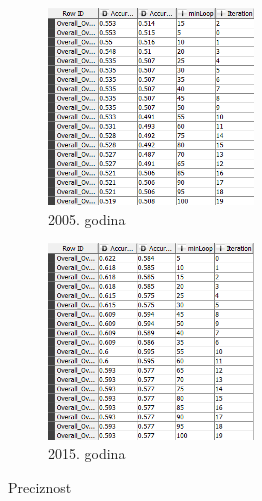 \documentclass[a4paper]{article}
\begin{document}
\begin{figure}[H]
	\begin{subfigure}[h]{\textwidth}
		\begin{center}
			\includegraphics[width=0.6\textwidth]{Klasifikacija/DrvoOdlucivanja/2005/Preciznost.png}
		\end{center}
		\caption{2005. godina}
		\label{fig:Preciznost2005}
	\end{subfigure}
	
	\vspace{0.5cm}
	\begin{subfigure}[h]{\textwidth}
		\begin{center}
			\includegraphics[width=0.6\textwidth]{Klasifikacija/DrvoOdlucivanja/2015/Preciznost.png}
		\end{center}
		\caption{2015. godina}
		\label{fig:Preciznost2015}
	\end{subfigure}
	
	\caption{Preciznost}
	\label{fig:PreciznostKNIME}
\end{figure}
\end{document}
